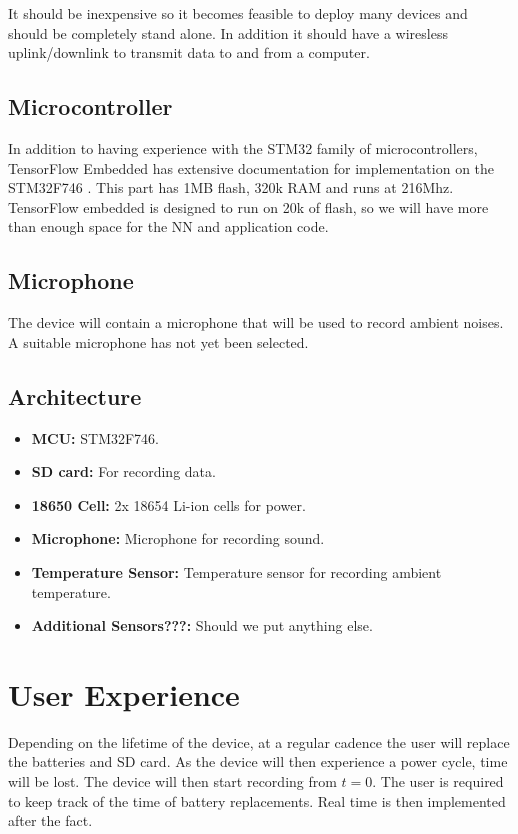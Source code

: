 \documentclass[12pt,journal,compsoc]{IEEEtran}
\begin{document}
It should be inexpensive so it becomes feasible to deploy many devices and should be completely stand alone. In addition it should have a wiresless uplink/downlink to transmit data to and from a computer.

\subsection{Microcontroller}
In addition to having experience with the STM32 family of microcontrollers, TensorFlow Embedded \cite{TF} has extensive documentation for implementation on the STM32F746 \cite{STM}. This part has 1MB flash, 320k RAM and runs at 216Mhz. TensorFlow embedded is designed to run on 20k of flash, so we will have more than enough space for the NN and application code.

\subsection{Microphone}
The device will contain a microphone that will be used to record ambient noises. A suitable microphone has not yet been selected.

\subsection{Architecture}
\begin{itemize}
\item{\textbf{MCU:} STM32F746.}
\item{\textbf{SD card:} For recording data.}
\item{\textbf{18650 Cell:} 2x 18654 Li-ion cells for power.}
\item{\textbf{Microphone:} Microphone for recording sound.}
\item{\textbf{Temperature Sensor:} Temperature sensor for recording ambient temperature.}
\item{\textbf{Additional Sensors???:} Should we put anything else.}
\end{itemize}

\section{User Experience}
Depending on the lifetime of the device, at a regular cadence the user will replace the batteries and SD card. As the device will then experience a power cycle, time will be lost. The device will then start recording from $t=0$. The user is required to keep track of the time of battery replacements. Real time is then implemented after the fact.
\end{document}
